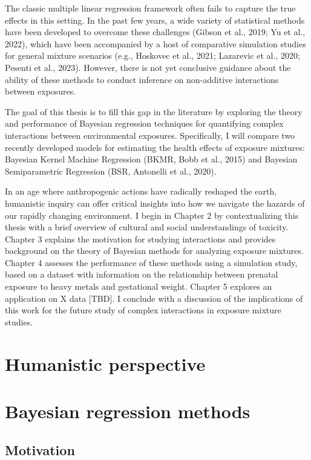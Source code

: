 \documentclass[12pt, twoside]{amherstthesis}
\begin{document}
The classic multiple linear regression framework often fails to capture the true effects in this setting. In the past few years, a wide variety of statistical methods have been developed to overcome these challenges (Gibson et al., 2019; Yu et al., 2022), which have been accompanied by a host of comparative simulation studies for general mixture scenarios (e.g., Hoskovec et al., 2021; Lazarevic et al., 2020; Pesenti et al., 2023). However, there is not yet conclusive guidance about the ability of these methods to conduct inference on non-additive interactions between exposures.

The goal of this thesis is to fill this gap in the literature by exploring the theory and performance of Bayesian regression techniques for quantifying complex interactions between environmental exposures. Specifically, I will compare two recently developed models for estimating the health effects of exposure mixtures: Bayesian Kernel Machine Regression (BKMR, Bobb et al., 2015) and Bayesian Semiparametric Regression (BSR, Antonelli et al., 2020).

In an age where anthropogenic actions have radically reshaped the earth, humanistic inquiry can offer critical insights into how we navigate the hazards of our rapidly changing environment. I begin in Chapter 2 by contextualizing this thesis with a brief overview of cultural and social understandings of toxicity. Chapter 3 explains the motivation for studying interactions and provides background on the theory of Bayesian methods for analyzing exposure mixtures. Chapter 4 assesses the performance of these methods using a simulation study, based on a dataset with information on the relationship between prenatal exposure to heavy metals and gestational weight. Chapter 5 explores an application on X data {[}TBD{]}. I conclude with a discussion of the implications of this work for the future study of complex interactions in exposure mixture studies.

\hypertarget{humanistic}{%
\chapter{Humanistic perspective}\label{humanistic}}

\hypertarget{bayes}{%
\chapter{Bayesian regression methods}\label{bayes}}

\hypertarget{motivation}{%
\section{Motivation}\label{motivation}}
\end{document}
